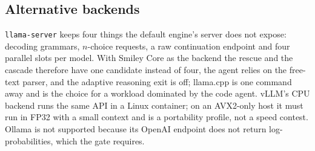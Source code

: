 \subsection{Alternative backends}
\texttt{llama-server} keeps four things the default engine's server does not
expose: decoding grammars, $n$-choice requests, a raw continuation endpoint
and four parallel slots per model. With Smiley Core as the backend the rescue
and the cascade therefore have one candidate instead of four, the agent
relies on the free-text parser, and the adaptive reasoning exit is off;
llama.cpp is one command away and is the choice for a workload dominated by
the code agent. vLLM's CPU backend runs the same API in a Linux container; on
an AVX2-only host it must run in FP32 with a small context and is a
portability profile, not a speed contest. Ollama is not supported because its
OpenAI endpoint does not return log-probabilities, which the gate requires.
